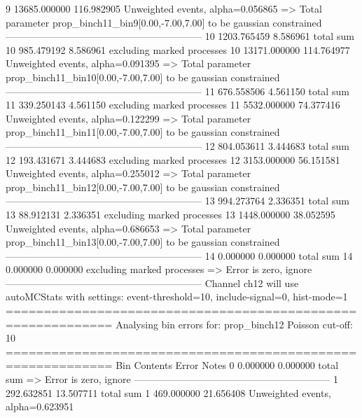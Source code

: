 9          13685.000000    116.982905      Unweighted events, alpha=0.056865
  => Total parameter prop_binch11_bin9[0.00,-7.00,7.00] to be gaussian constrained
------------------------------------------------------------
10         1203.765459     8.586961        total sum                     
10         985.479192      8.586961        excluding marked processes    
10         13171.000000    114.764977      Unweighted events, alpha=0.091395
  => Total parameter prop_binch11_bin10[0.00,-7.00,7.00] to be gaussian constrained
------------------------------------------------------------
11         676.558506      4.561150        total sum                     
11         339.250143      4.561150        excluding marked processes    
11         5532.000000     74.377416       Unweighted events, alpha=0.122299
  => Total parameter prop_binch11_bin11[0.00,-7.00,7.00] to be gaussian constrained
------------------------------------------------------------
12         804.053611      3.444683        total sum                     
12         193.431671      3.444683        excluding marked processes    
12         3153.000000     56.151581       Unweighted events, alpha=0.255012
  => Total parameter prop_binch11_bin12[0.00,-7.00,7.00] to be gaussian constrained
------------------------------------------------------------
13         994.273764      2.336351        total sum                     
13         88.912131       2.336351        excluding marked processes    
13         1448.000000     38.052595       Unweighted events, alpha=0.686653
  => Total parameter prop_binch11_bin13[0.00,-7.00,7.00] to be gaussian constrained
------------------------------------------------------------
14         0.000000        0.000000        total sum                     
14         0.000000        0.000000        excluding marked processes    
  => Error is zero, ignore      
------------------------------------------------------------
Channel ch12 will use autoMCStats with settings: event-threshold=10, include-signal=0, hist-mode=1
============================================================
Analysing bin errors for: prop_binch12
Poisson cut-off: 10
============================================================
Bin        Contents        Error           Notes                         
0          0.000000        0.000000        total sum                     
  => Error is zero, ignore      
------------------------------------------------------------
1          292.632851      13.507711       total sum                     
1          469.000000      21.656408       Unweighted events, alpha=0.623951
